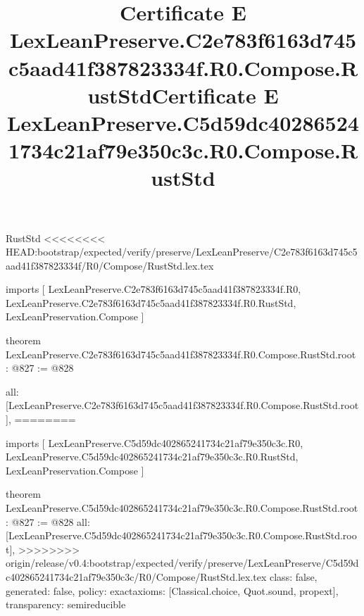 \begin{lexlean}{RustStd}
<<<<<<<< HEAD:bootstrap/expected/verify/preserve/LexLeanPreserve/C2e783f6163d745c5aad41f387823334f/R0/Compose/RustStd.lex.tex
\title{Certificate E LexLeanPreserve.C2e783f6163d745c5aad41f387823334f.R0.Compose.RustStd}
\begin{coremodule}
imports [
  LexLeanPreserve.C2e783f6163d745c5aad41f387823334f.R0,
  LexLeanPreserve.C2e783f6163d745c5aad41f387823334f.R0.RustStd,
  LexLeanPreservation.Compose
]

theorem LexLeanPreserve.C2e783f6163d745c5aad41f387823334f.R0.Compose.RustStd.root : @827 := @828 {
  all: [LexLeanPreserve.C2e783f6163d745c5aad41f387823334f.R0.Compose.RustStd.root],
========
\title{Certificate E LexLeanPreserve.C5d59dc402865241734c21af79e350c3c.R0.Compose.RustStd}
\begin{coremodule}
imports [
  LexLeanPreserve.C5d59dc402865241734c21af79e350c3c.R0,
  LexLeanPreserve.C5d59dc402865241734c21af79e350c3c.R0.RustStd,
  LexLeanPreservation.Compose
]

theorem LexLeanPreserve.C5d59dc402865241734c21af79e350c3c.R0.Compose.RustStd.root : @827 := @828 {
  all: [LexLeanPreserve.C5d59dc402865241734c21af79e350c3c.R0.Compose.RustStd.root],
>>>>>>>> origin/release/v0.4:bootstrap/expected/verify/preserve/LexLeanPreserve/C5d59dc402865241734c21af79e350c3c/R0/Compose/RustStd.lex.tex
  class: false,
  generated: false,
  policy: exact{axioms: [Classical.choice, Quot.sound, propext]},
  transparency: semireducible
}


\end{coremodule}}
\end{coremodule}
\end{lexlean}
